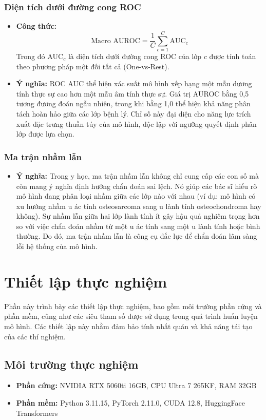 \subsubsection{Diện tích dưới đường cong ROC}
\begin{itemize}
    \item \textbf{Công thức:}
    \begin{equation}
        \text{Macro AUROC} = \frac{1}{C} \sum_{c=1}^{C} \text{AUC}_c
    \end{equation}
    Trong đó $\text{AUC}_c$ là diện tích dưới đường cong ROC của lớp $c$ được tính toán theo phương pháp một đối tất cả (One-vs-Rest).
    \item \textbf{Ý nghĩa:} ROC AUC thể hiện xác suất mô hình xếp hạng một mẫu dương tính thực sự cao hơn một mẫu âm tính thực sự. Giá trị AUROC bằng 0,5 tương đương đoán ngẫu nhiên, trong khi bằng 1,0 thể hiện khả năng phân tách hoàn hảo giữa các lớp bệnh lý. Chỉ số này đại diện cho năng lực trích xuất đặc trưng thuần túy của mô hình, độc lập với ngưỡng quyết định phân lớp được lựa chọn.
\end{itemize}

\subsubsection{Ma trận nhầm lẫn}
\begin{itemize}
    \item \textbf{Ý nghĩa:} Trong y học, ma trận nhầm lẫn không chỉ cung cấp các con số mà còn mang ý nghĩa định hướng chẩn đoán sai lệch. Nó giúp các bác sĩ hiểu rõ mô hình đang phân loại nhầm giữa các lớp nào với nhau (ví dụ: mô hình có xu hướng nhầm u ác tính osteosarcoma sang u lành tính osteochondroma hay không). Sự nhầm lẫn giữa hai lớp lành tính ít gây hậu quả nghiêm trọng hơn so với việc chẩn đoán nhầm từ một u ác tính sang một u lành tính hoặc bình thường. Do đó, ma trận nhầm lẫn là công cụ đắc lực để chẩn đoán lâm sàng lỗi hệ thống của mô hình.
\end{itemize}

\section{Thiết lập thực nghiệm}
Phần này trình bày các thiết lập thực nghiệm, bao gồm môi trường phần cứng và phần mềm, cũng như các siêu tham số được sử dụng trong quá trình huấn luyện mô hình. Các thiết lập này nhằm đảm bảo tính nhất quán và khả năng tái tạo của các thí nghiệm.
\subsection{Môi trường thực nghiệm}
\begin{itemize}
    \item \textbf{Phần cứng:} NVIDIA RTX 5060ti 16GB, CPU Ultra 7 265KF, RAM 32GB
    \item \textbf{Phần mềm:} Python 3.11.15, PyTorch 2.11.0, CUDA 12.8, HuggingFace Transformers
\end{itemize}
